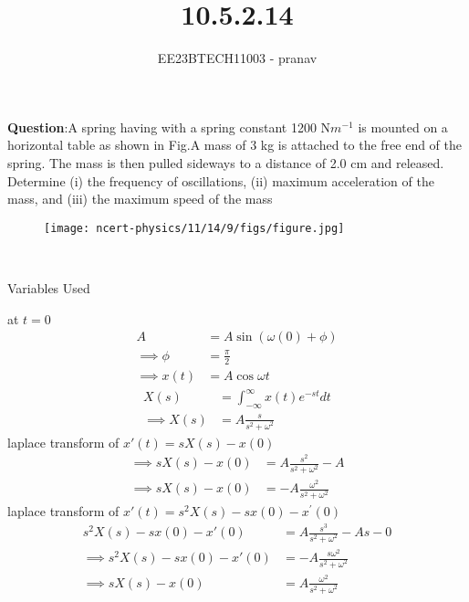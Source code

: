 \documentclass[journal,12pt,twocolumn]{IEEEtran}
\theoremstyle{remark}
\begin{document}

\vspace{3cm}

\title{10.5.2.14}
\author{EE23BTECH11003 - pranav}
\maketitle
\newpage

\bigskip
\renewcommand{\thefigure}{\arabic{figure}}
\renewcommand{\thetable}{\arabic{table}}

\textbf{Question}:A spring having with a spring constant 1200 N$m^{-1}$ is mounted on a horizontal
table as shown in Fig.A mass of 3 kg is attached to the free end of the
spring. The mass is then pulled sideways to a distance of 2.0 cm and released.\\
Determine (i) the frequency of oscillations, (ii) maximum acceleration of the mass,
and (iii) the maximum speed of the mass
\begin{figure}[h!]
    \centering
    \texttt{[image: ncert-physics/11/14/9/figs/figure.jpg]}
    \caption{ }
    
\end{figure}\\
\solution
\fi
\begin{table}[h!]
    \centering
    
    \caption{Variables Used}
\end{table}
at $t=0$
\begin{align}
A&=A\sin{(\omega(0)+\phi)}\\
\implies \phi&=\frac{\pi}{2}\\
\implies x(t)&=A\cos{\omega t} 
\end{align}
\begin{align}
X(s)&=\int_{-\infty}^{\infty} x(t)e^{-st}dt \\
\implies X(s)&=A\frac{s}{s^2+\omega^2}
\end{align}
laplace transform of $x'(t)=sX(s)-x(0)$
\begin{align}
 \implies sX(s)-x(0)&=A\frac{s^2}{s^2+\omega^2}-A\\
 \implies sX(s)-x(0)&=-A\frac{\omega^2}{s^2+\omega^2}
\end{align}
laplace transform of  $x'(t)=s^2X(s)-sx(0)-x^{'}(0)$
\begin{align}
s^2X(s)-sx(0)-x'(0)&=A\frac{s^3}{s^2+\omega^2}-As-0\\
\implies s^2X(s)-sx(0)-x'(0)&=-A\frac{s\omega^2}{s^2+\omega^2}\\
\implies sX(s)-x(0)&=A\frac{\omega^2}{s^2+\omega^2}
\end{align}
\end{document}
